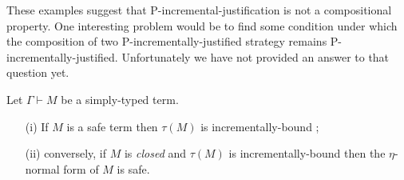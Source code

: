 These examples suggest that P-incremental-justification is not a compositional property.
One interesting problem would be to find some condition under which  the composition of two P-incrementally-justified strategy remains
P-incrementally-justified.
Unfortunately we have not provided an answer to that question yet.


\begin{lemma}
\label{lem:safe_imp_incrbound} Let $\Gamma \vdash M$ be a
simply-typed term.
\begin{itemize}
\item[(i)] If $M$ is a safe term then $\tau(M)$ is incrementally-bound ;
\item[(ii)] conversely, if $M$ is \emph{closed} and $\tau(M)$ is incrementally-bound then the $\eta$-normal form of $M$ is safe.
\end{itemize}
\end{lemma}

